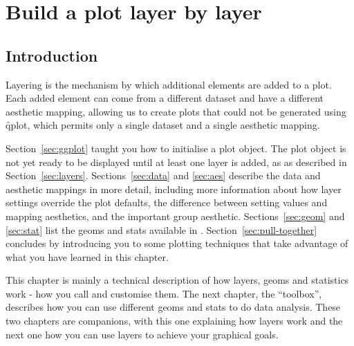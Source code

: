 

% 


\chapter{Build a plot layer by layer}
\label{cha:layers}

\section{Introduction}


Layering is the mechanism by which additional elements are added to a plot.  Each added element can come from a different dataset and have a different aesthetic mapping, allowing us to create plots that could not be generated using \f{qplot}, which permits only a single dataset and a single aesthetic mapping.

Section~\ref{sec:ggplot} taught you how to initialise a plot object. The plot object is not yet ready to be displayed until at least one layer is added, as as described in Section~\ref{sec:layers}. Sections~\ref{sec:data} and \ref{sec:aes} describe the data and aesthetic mappings in more detail, including more information about how layer settings override the plot defaults, the difference between setting values and mapping aesthetics, and the important group aesthetic.  Sections~\ref{sec:geom} and \ref{sec:stat} list the geoms and stats available in \ggplot.  Section~\ref{sec:pull-together} concludes by introducing you to some plotting techniques that take advantage of what you have learned in this chapter.

This chapter is mainly a technical description of how layers, geoms and statistics work - how you call and customise them.  The next chapter, the \ggplot ``toolbox'', describes how you can use different geoms and stats to do data analysis. 
These two chapters are companions, with this one explaining how layers work and the next one how you can use layers to achieve your graphical goals.

